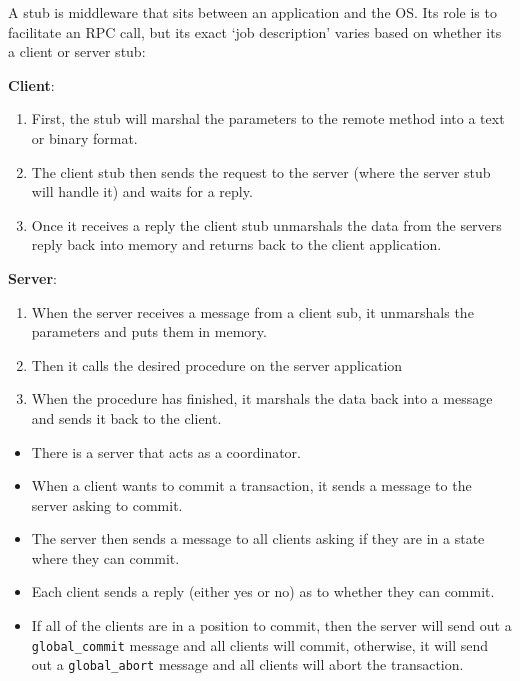 
A stub is middleware that sits between an application and the OS. Its role is to
facilitate an RPC call, but its exact `job description' varies based on whether
its a client or server stub:

\begin{description}
  \item \textbf{Client}:
    \begin{enumerate}
      \item First, the stub will marshal the parameters to the remote method
        into a text or binary format.
      \item The client stub then sends the request to the server (where the
        server stub will handle it) and waits for a reply.
      \item Once it receives a reply the client stub unmarshals the data from
        the servers reply back into memory and returns back to the client
        application.
    \end{enumerate}
  \item \textbf{Server}:
    \begin{enumerate}
      \item When the server receives a message from a client sub, it unmarshals
        the parameters and puts them in memory.
      \item Then it calls the desired procedure on the server application
      \item When the procedure has finished, it marshals the data back into a
        message and sends it back to the client.
    \end{enumerate}
\end{description}


\begin{itemize}
  \item There is a server that acts as a coordinator.
  \item When a client wants to commit a transaction, it sends a message to the
    server asking to commit.
  \item The server then sends a message to all clients asking if they are in a 
    state where they can commit.
  \item Each client sends a reply (either yes or no) as to whether they can
    commit.
  \item If all of the clients are in a position to commit, then the server will
    send out a \texttt{global\_commit} message and all clients will commit, 
    otherwise, it will send out a \texttt{global\_abort} message and all clients
    will abort the transaction.
\end{itemize}

